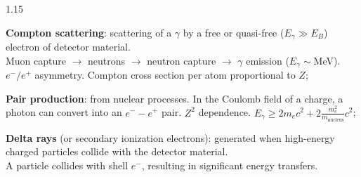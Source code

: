 \documentclass{beamer}
\begin{document}
\begin{frame}
    \begin{columns}
        \begin{column}{1.15\framewidth}
            \begin{itemize}
               {\small \item \textbf{Compton scattering}: scattering of a $\gamma$ by a free or quasi-free ($E_\gamma \gg E_B$)
               electron of detector material. 
               \\
               Muon capture $\rightarrow$ neutrons $\rightarrow$ neutron capture $\rightarrow$ $\gamma$ emission ($E_\gamma \sim$MeV). 
            \\
               $e^-/ e^+$ asymmetry. Compton cross section per atom proportional to $Z$;  
               \vspace{2mm}
               \item \textbf{Pair production}: from nuclear processes. In the Coulomb 
               field of a charge, a photon can convert into an $e^- - e^+$ pair. $Z^2$ dependence.  
               $E_{\gamma} \geq 2m_e c^2 + 2 \frac{m_e^2}{m_{\text{nucleus}}} c^2$;
               \vspace{2mm}
               \item \textbf{Delta rays} (or secondary ionization electrons): generated
               when high-energy charged particles collide with the detector material. 
               \\
               A particle collides with shell $e^-$, 
               resulting in significant energy transfers. 
                }
            \end{itemize}
        \end{column}
        \end{columns}
\end{frame}
\end{document}
